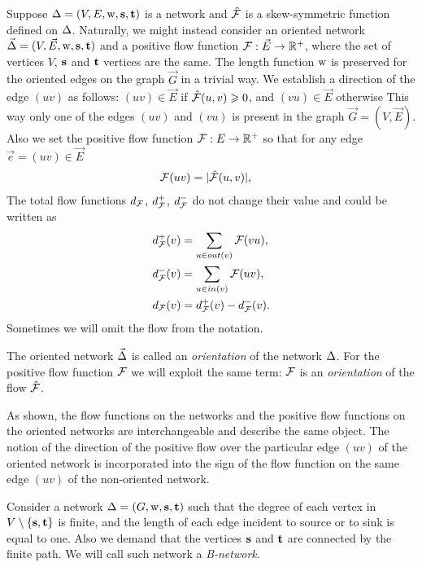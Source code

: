\documentclass[12pt]{amsart}
\begin{document}
    Suppose $\Delta = (V, E, \mathrm{w}, \mathbf{s}, \mathbf{t})$ is a network and $\mathcal{\hat{F}}$ is a skew-symmetric function defined
    on $\Delta$.
    Naturally, we might instead consider an oriented network $\vec{\Delta} = (V, \vec{E}, \mathrm{w}, \mathbf{s}, \mathbf{t})$ and a
      positive flow function $\mathcal{F}: \vec{E} \to \mathbb{R}^{+}$, where
      the set of vertices $V$, $\mathbf{s}$ and $\mathbf{t}$ vertices are the same.
    The length function $\mathrm{w}$ is preserved for the oriented edges on the graph $\vec{G}$ in a trivial way.
    We establish a direction of the edge $(uv)$ as follows:
      $(uv) \in \vec{E}$ if $\mathcal{\hat{F}}(u, v) \geqslant 0$, and $(vu) \in \vec{E}$ otherwise
    This way only one of the edges $(uv)$ and $(vu)$ is present in the graph $\vec{G} = (V, \vec{E})$.
    Also we set the positive flow function $\mathcal{F}: E \to \mathbb{R}^{+}$ so that
      for any edge $\vec{e} = (uv) \in \vec{E}$
    \begin{align*}
      &\mathcal{F}(u v) = \lvert\mathcal{\hat{F}}(u,v)\rvert,
    \end{align*}
    The total flow functions $d_{\mathcal{F}}$, $d^{+}_{\mathcal{F}}$, $d^{-}_{\mathcal{F}}$ do not change their value and could be written as
    \begin{align*}
      &d^{+}_{\mathcal{F}}(v) = \sum_{u \in out(v)} \mathcal{F}(vu),\\
      &d^{-}_{\mathcal{F}}(v) = \sum_{u \in in(v)} \mathcal{F}(uv),\\
      &d_{\mathcal{F}}(v) = d^{+}_{\mathcal{F}}(v) - d^{-}_{\mathcal{F}}(v).
    \end{align*}
    Sometimes we will omit the flow from the notation.
    \begin{definition}
      The oriented network $\vec{\Delta}$ is called an \emph{orientation} of the network $\Delta$.
      For the positive flow function $\mathcal{F}$ we will exploit the same term:
        $\mathcal{F}$ is an \emph{orientation} of the flow $\mathcal{\hat{F}}$.
    \end{definition}
    \begin{remark}
      As shown, the flow functions on the networks and the positive flow functions on the oriented networks
        are interchangeable and describe the same object.
      The notion of the direction of the positive flow over the particular edge $(uv)$ of the oriented network
        is incorporated into the sign of the flow function on the same edge $(uv)$ of the non-oriented network.
    \end{remark}
    \begin{definition}
      Consider a network $\Delta = (G, \mathrm{w}, \mathbf{s}, \mathbf{t})$ such that
        the degree of each vertex in $V \setminus \{\mathbf{s}, \mathbf{t}\} $ is finite,
        and the length of each edge incident to source or to sink is equal to one.
      Also we demand that the vertices $\mathbf{s}$ and $\mathbf{t}$ are connected by the finite path.
      We will call such network a \emph{B-network}.
    \end{definition}
\end{document}

